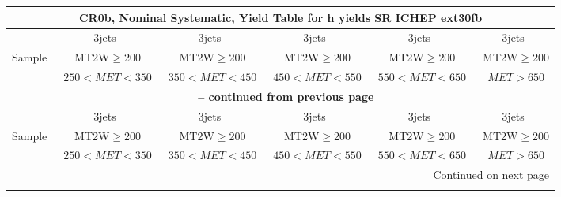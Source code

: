\documentclass{article}
\begin{document}
\begin{longtable}{|l|c|c|c|c|c|} 
 
\multicolumn{6}{c}{ CR0b, Nominal Systematic, Yield Table for h yields SR ICHEP ext30fb }\\* \hline 
  & 3jets  & 3jets  & 3jets  & 3jets  & 3jets \\* 
Sample  & ~MT2W$\ge$200  & ~MT2W$\ge$200  & ~MT2W$\ge$200  & ~MT2W$\ge$200  & ~MT2W$\ge$200 \\* 
  & ~$250<MET<350$  & ~$350<MET<450$  & ~$450<MET<550$  & ~$550<MET<650$  & ~$MET>650$ \\* 
\hline \hline 
\endfirsthead 
 
\multicolumn{6}{c}{{\bfseries \tablename\ \thetable{} -- continued from previous page}}\\* \hline 
  & 3jets  & 3jets  & 3jets  & 3jets  & 3jets \\* 
Sample  & ~MT2W$\ge$200  & ~MT2W$\ge$200  & ~MT2W$\ge$200  & ~MT2W$\ge$200  & ~MT2W$\ge$200 \\* 
  & ~$250<MET<350$  & ~$350<MET<450$  & ~$450<MET<550$  & ~$550<MET<650$  & ~$MET>650$ \\* 
\hline \hline 
\endhead 
 
\multicolumn{6}{|r|}{{Continued on next page}}\\* \hline 
\endfoot 
 
 
\endlastfoot 
 

\end{longtable}
\end{document}
